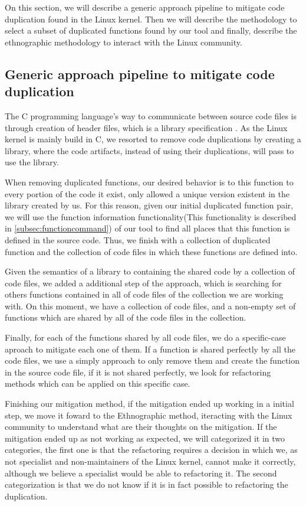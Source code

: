On this section, we will describe a generic approach pipeline to mitigate code duplication found in the Linux kernel. Then we
will describe the methodology to select a subset of duplicated functions found by our tool and finally, describe the ethnographic
methodology to interact with the Linux community.


\subsection{Generic approach pipeline to mitigate code duplication}

\label{subsec:pipeline}

The C programming language's way to communicate between source code files is through creation of header files, which is
a library specification \citep{Cbook}. As the Linux kernel is mainly build in C, we resorted to remove code duplications by
creating a library, where the code artifacts, instead of using their duplications, will pass to use the library.

When removing duplicated functions, our desired behavior is to this function to every portion of the code it exist, only allowed a
unique version existent in the library created by us. For this reason, given our initial duplicated function pair, we will use 
the function information functionality(This functionality is described in \ref{subsec:functioncommand}) of our tool to find all 
places that this function is defined in the source code. Thus, we finish with a collection of duplicated function and the collection
of code files in which these functions are defined into.

Given the semantics of a library to containing the shared code by a collection of code files, we added a additional step of the 
approach, which is searching for others functions contained in all of code files of the collection we are working with. 
On this moment, we have a collection of code files, and a non-empty set of functions which are shared by all of the code files 
in the collection.

Finally, for each of the functions shared by all code files, we do a specific-case aproach to mitigate each one of them.
If a function is shared perfectly by all the code files, we use a simply approach to only remove them and create the function in
the source code file, if it is not shared perfectly, we look for refactoring methods which can be applied on this specific case. 

Finishing our mitigation method, if the mitigation ended up working in a initial step, we move it foward to the 
Ethnographic method, iteracting with the Linux community to understand what are their thoughts on the mitigation. If the mitigation
ended up as not working as expected, we will categorized it in two categories, the first one is that the refactoring requires a
decision in which we, as not specialist and non-maintainers of the Linux kernel, cannot make it correctly, although
we believe a specialist would be able to refactoring it. The second categorization is that we do not know if it is in fact possible
to refactoring the duplication. 


